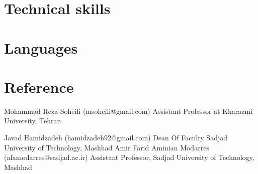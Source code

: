 \documentclass[a4paper]{moderncv}        %
\begin{document}
\vspace*{-0.5\baselineskip}
\section{Technical skills}

\vspace*{-0.5\baselineskip}
\section{Languages}


\section{Reference}

\cventry
{}
{Mohammad Reza Soheili}
{(msoheili@gmail.com)}
{}
{}
{Assistant Professor at Kharazmi University, Tehran}


\cventry
{}
{Javad Hamidzadeh}
{(hamidzadeh92@gmail.com)}
{}
{}
{Dean Of Faculty Sadjad University of Technology, Mashhad}
\cventry
{}
{Amir Farid Aminian Modarres}
{(afamodarres@sadjad.ac.ir)}
{}
{}
{Assistant Professor, Sadjad University of Technology, Mashhad}
\end{document}
